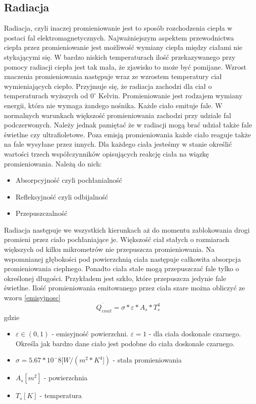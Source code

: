 \subsection {Radiacja}
\label{Radiacja}
Radiacja, czyli inaczej promieniowanie jest to sposób rozchodzenia ciepła w postaci fal elektromagnetycznych. 
Najważniejszym aspektem przewodnictwa ciepła przez promieniowanie jest możliwość wymiany ciepła między ciałami
nie stykającymi się.
W bardzo niskich temperaturach ilość przekazywanego przy pomocy radiacji ciepła jest tak mała, że zjawisko to może być pomijane.
Wzrost znaczenia promieniowania następuje wraz ze wzrostem temperatury ciał wymieniających ciepło.
Przyjmuje się, że radiacja zachodzi dla ciał o temperaturach wyższych od $0 ^\circ$ Kelvin.
Promieniowanie jest rodzajem wymiany energii, która nie wymaga żandego nośnika. Każde ciało emituje fale.
W normalnych warunkach większość promieniowania zachodzi przy udziale fal podczerwonych. Należy jednak pamiętać
że w radiacji mogą brać udział także fale świetlne czy ultrafioletowe. Poza emisją promieniowania każde ciało reaguje także
na fale wysyłane przez innych. Dla każdego ciała jesteśmy w stanie określić wartości trzech współczynników opisujących 
reakcję ciała na wiązkę promieniowania. Należą do nich:
\begin {itemize}
\item Absorpcyjność czyli pochłanialność
\item Refleksyjność czyli odbijalność
\item Przepuszczalność
\end {itemize}
Radiacja następuje we wszystkich kierunkach aż  do momentu zablokowania drogi promieni przez ciało pochłaniające je.
Większość ciał stałych o rozmiarach większych od kilku mikrometrów nie przepuszcza promieniowania. Na wspomnianej 
głębokości pod powierzchnią ciała następuje całkowita absorpcja promieniowania cieplnego. Ponadto ciała stałe mogą przepuszczać
fale tylko o określonej długości. Przykładem jest szkło, które przepuszcza jedynie fale świetlne.
Ilość promieniowania emitowanego przez ciała szare można obliczyć ze wzoru \ref{emisyjnosc}
\begin {equation}
\dot{Q_{emit}}=\sigma*\varepsilon*A_{s}*T_{s}^4
\label {emisyjnosc}
\end {equation}
gdzie
\begin{itemize}
\item $\varepsilon \in (0,1)$ - emisyjność powierzchni. $\varepsilon=1$ - dla ciała doskonale czarnego. Określa jak bardzo dane 
ciało jest podobne do ciała doskonale czarnego.
\item $\sigma = 5.67 * 10^-8 [W/(m^2 * K^4]) $ - stała promieniowania
\item $A_{s} [m^2]$ - powierzchnia 
\item $T_{s} [K]$ - temperatura
\end {itemize}
